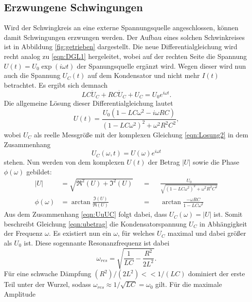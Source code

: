 \subsection{Erzwungene Schwingungen}
Wird der Schwingkreis an eine externe Spannungsquelle angeschlossen, können damit Schwingungen erzwungen werden. Der Aufbau eines solchen Schwinkreises
ist in Abbildung \ref{fig:getrieben} dargestellt. Die neue Differentialgleichung wird recht analog zu \eqref{eqn:DGL1} hergeleitet, wobei auf der
rechten Seite die Spannung $U(t)=U_0\exp(i\omega t)$ der Spanungsquelle ergänzt wird. Wegen dieser wird nun auch die Spannung $U_C(t)$ auf dem Kondensator
und nicht mehr $I(t)$ betrachtet. Es ergibt sich demnach
\begin{equation*}
    LC\ddot{U}_C+RC\dot{U}_C+U_C=U_0e^{i\omega t}   .
    \label{eqn:DGL2}
\end{equation*}
Die allgemeine Lösung dieser Differentialgleichung lautet
\begin{equation}
    U(t)=\frac{U_0(1-LC\omega^2-i\omega RC)}{(1-LC\omega^2)^2+\omega^2R^2C^2}   ,
    \label{eqn:Losung2}
\end{equation}
wobei $U_C$ als reelle Messgröße mit der komplexen Gleichung \eqref{eqn:Losung2} in dem Zusammenhang
\begin{equation}
    U_C(\omega,t)=U(\omega)e^{i\omega t}
    \label{eqn:UuUC}
\end{equation}
stehen. Nun werden von dem komplexen $U(t)$ der Betrag $|U|$ sowie die Phase $\phi(\omega)$ gebildet:
\begin{align} %
    |U|          &= \sqrt{\Re^2(U)+\Im^2(U)}      & &=& &\frac{U_0}{\sqrt{(1-LC\omega^2)^2+\omega^2R^2C^2}} \label{eqn:ubetrag} \\
    \phi(\omega) &= \arctan{\frac{\Im(U)}{\Re(U)}}& &=& &\arctan{\frac{-\omega RC}{1-LC\omega^2}} \label{eqn:uphase}
\end{align}
Aus dem Zusammenhang \eqref{eqn:UuUC} folgt dabei, dass $U_C(\omega)=|U|$ ist. Somit beschreibt Gleichung \eqref{eqn:ubetrag} die Kondensatorspannung
$U_C$ in Abhängigkeit der Frequenz $\omega$. Es existiert nun ein $\omega$, für welches $U_C$ maximal und dabei größer als $U_0$ ist. Diese
sogennante Resonanzfrequenz ist dabei
\begin{equation}
    \omega_{res}=\sqrt{\frac{1}{LC}-\frac{R^2}{2L^2}}   .
    \label{eqn:resfre}
\end{equation}
Für eine schwache Dämpfung $(R^2)/(2L^2)<<1/(LC)$ dominiert der erste Teil unter der Wurzel, sodass $\omega_{res}\approx 1/\sqrt{LC}=\omega_0$ gilt. Für die maximale Amplitude
